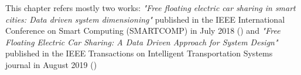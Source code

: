 %
%
%
%

This chapter refers mostly two works: \textit{"Free floating electric car sharing in smart cities: Data driven system dimensioning"} published in the IEEE International Conference on Smart Computing (SMARTCOMP) in July 2018 (\cite{taormina}) and \textit{"Free Floating Electric Car Sharing: A Data Driven Approach for System Design"} published in the IEEE Transactions on Intelligent Transportation Systems journal in August 2019 (\cite{coccacar})
